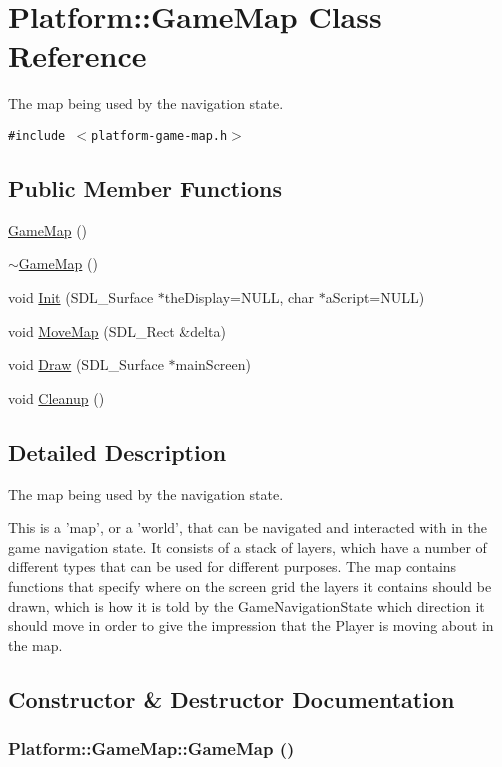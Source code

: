 \hypertarget{class_platform_1_1_game_map}{
\section{Platform::GameMap Class Reference}
\label{de/db6/class_platform_1_1_game_map}
}
The map being used by the navigation state.  


{\tt \#include $<$platform-game-map.h$>$}

\subsection*{Public Member Functions}
\begin{CompactItemize}
\item 
\hyperlink{class_platform_1_1_game_map_9388eca457dc888ce1370138b873a29e}{GameMap} ()
\item 
\hyperlink{class_platform_1_1_game_map_ad7094a561f89baf77d2015768dd9808}{$\sim$GameMap} ()
\item 
void \hyperlink{class_platform_1_1_game_map_0f5c16cce18b155235588af572cfba7f}{Init} (SDL\_\-Surface $\ast$theDisplay=NULL, char $\ast$aScript=NULL)
\item 
void \hyperlink{class_platform_1_1_game_map_76634e9c99fe04d801cc324ba0b0ed8a}{MoveMap} (SDL\_\-Rect \&delta)
\item 
void \hyperlink{class_platform_1_1_game_map_08581c79e3244f70c4e26b886b0479de}{Draw} (SDL\_\-Surface $\ast$mainScreen)
\item 
void \hyperlink{class_platform_1_1_game_map_3a2969cccbc16f1ad11e505da961a105}{Cleanup} ()
\end{CompactItemize}


\subsection{Detailed Description}
The map being used by the navigation state. 

This is a 'map', or a 'world', that can be navigated and interacted with in the game navigation state. It consists of a stack of layers, which have a number of different types that can be used for different purposes. The map contains functions that specify where on the screen grid the layers it contains should be drawn, which is how it is told by the GameNavigationState which direction it should move in order to give the impression that the Player is moving about in the map. 

\subsection{Constructor \& Destructor Documentation}
\hypertarget{class_platform_1_1_game_map_9388eca457dc888ce1370138b873a29e}{
\subsubsection[{GameMap}]{\setlength{\rightskip}{0pt plus 5cm}Platform::GameMap::GameMap ()}}
\label{de/db6/class_platform_1_1_game_map_9388eca457dc888ce1370138b873a29e}


